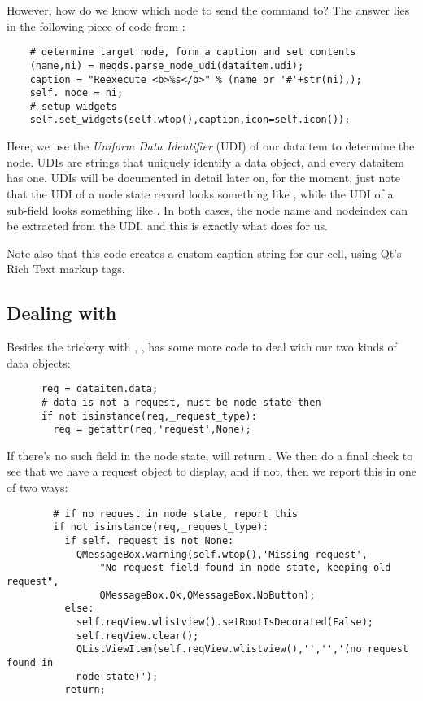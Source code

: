 \documentclass[12pt,twoside]{book}
\begin{document}
  However, how do we know which node to send the command to? The answer lies in
  the following piece of code from :

\begin{verbatim}  
    # determine target node, form a caption and set contents
    (name,ni) = meqds.parse_node_udi(dataitem.udi);
    caption = "Reexecute <b>%s</b>" % (name or '#'+str(ni),);
    self._node = ni;
    # setup widgets
    self.set_widgets(self.wtop(),caption,icon=self.icon());
\end{verbatim}  

  Here, we use the {\em Uniform Data Identifier} (UDI) of our dataitem to
  determine the node. UDIs are strings that uniquely identify a data object, and
  every dataitem has one. UDIs will be documented in detail later on, for the
  moment, just note that the UDI of a node state record looks something like
  , while the UDI of a sub-field looks something like
  . In both cases, the node name and nodeindex
  can be extracted from the UDI, and this is exactly what
   does for us.
  
  Note also that this code creates a custom caption string for our cell, using
  Qt's Rich Text markup tags. 

\subsection{Dealing with }
  
  Besides the trickery with , , has some more
  code to deal with our two kinds of data objects:

\begin{verbatim}  
      req = dataitem.data;
      # data is not a request, must be node state then
      if not isinstance(req,_request_type):
        req = getattr(req,'request',None);
\end{verbatim}  
  
  If there's no such field in the node state,  will return
  . We then do a final check to see that we have a request object 
  to display, and if not, then we report this in one of two ways:

\begin{verbatim}  
        # if no request in node state, report this
        if not isinstance(req,_request_type): 
          if self._request is not None:
            QMessageBox.warning(self.wtop(),'Missing request',
                "No request field found in node state, keeping old request",
                QMessageBox.Ok,QMessageBox.NoButton);
          else:
            self.reqView.wlistview().setRootIsDecorated(False);
            self.reqView.clear();
            QListViewItem(self.reqView.wlistview(),'','','(no request found in
            node state)');
          return;
\end{verbatim}  
\end{document}
